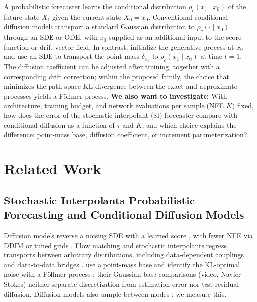 \documentclass{article}
\begin{document}
A probabilistic forecaster learns the conditional distribution $\rho_c(x_1 \mid x_0)$ of the future state $X_1$ given the current state $X_0=x_0$. Conventional conditional diffusion models \citep{rasul2021timegrad,kohl2023benchmarking,price2025gencast} transport a standard Gaussian distribution to $\rho_c(\cdot \mid x_0)$ through an SDE or ODE, with $x_0$ supplied as an additional input to the score function or drift vector field. In contrast, \cite{chen2024forecasting} initialize the generative process at $x_0$ and use an SDE to transport the point mass $\delta_{x_0}$ to $\rho_c(x_1 \mid x_0)$ at time $t=1$. The diffusion coefficient can be adjusted after training, together with a corresponding drift correction; within the proposed family, the choice that minimizes the path-space KL divergence between the exact and approximate processes yields a F\"ollmer process. \textbf{We also want to investigate:}
With architecture, training budget, and network evaluations per sample (NFE $K$) fixed, how does the error of the stochastic-interpolant (SI) forecaster compare with conditional diffusion as a function of $\tau$ and $K$, and which choice explains the difference: point-mass base, diffusion coefficient, or increment parameterization?



\section{Related Work}
\subsection{Stochastic Interpolants Probabilistic Forecasting and Conditional Diffusion Models}
Diffusion models reverse a noising SDE with a learned score \citep{ho2020ddpm,song2021sde}, with fewer NFE via DDIM \citep{song2021ddim} or tuned grids \citep{karras2022edm}. Flow matching \citep{lipman2023flow} and stochastic interpolants \citep{albergo2023stochastic} regress transports between arbitrary distributions, including data-dependent couplings \citep{albergo2024couplings} and data-to-data bridges \citep{liu2023i2sb}. \cite{chen2024forecasting} use a point-mass base and identify the KL-optimal noise with a F\"ollmer process \citep{follmer1986}; their Gaussian-base comparisons (video, Navier--Stokes) neither separate discretization from estimation error nor test residual diffusion. Diffusion models also sample between modes \citep{aithal2024hallucinations}; we measure this.
\end{document}
